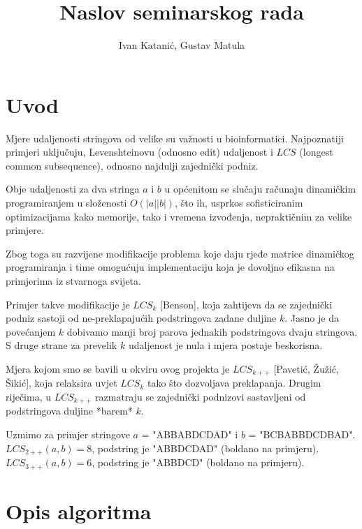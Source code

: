 \documentclass[times, utf8, seminar, numeric]{fer}
\begin{document}
\nocite{*}

\title{Naslov seminarskog rada}

\author{Ivan Katanić, Gustav Matula}


\maketitle

\tableofcontents

\chapter{Uvod}
Mjere udaljenosti stringova od velike su važnosti u bioinformatici.
Najpoznatiji primjeri uključuju, Levenshteinovu (odnosno edit)
udaljenost i $LCS$ (longest common subsequence), odnosno najdulji
zajednički podniz.

Obje udaljenosti za dva stringa $a$ i $b$ u općenitom se slučaju
računaju dinamičkim programiranjem u složenosti $O(|a||b|)$, što ih,
usprkos sofisticiranim optimizacijama kako memorije, tako i vremena
izvođenja, nepraktičnim za velike primjere.

Zbog toga su razvijene modifikacije problema koje daju rjeđe matrice
dinamičkog programiranja i time omogućuju implementaciju koja je 
dovoljno efikasna na primjerima iz stvarnoga svijeta.

Primjer takve modifikacije je $LCS_k$ [Benson], koja zahtijeva da
se zajednički podniz sastoji od ne-preklapajućih podstringova
zadane duljine $k$. Jasno je da povećanjem $k$ dobivamo manji
broj parova jednakih podstringova dvaju stringova. S druge strane
za prevelik $k$ udaljenost je nula i mjera postaje beskorisna.

Mjera kojom smo se bavili u okviru ovog projekta je $LCS_{k++}$ [Pavetić,
  Žužić, Šikić], koja relaksira uvjet $LCS_k$ tako što dozvoljava
preklapanja. Drugim riječima, u $LCS_{k++}$ razmatraju se zajednički
podnizovi sastavljeni od podstringova duljine *barem* $k$.

Uzmimo za primjer stringove $a$ = "ABBABDCDAD" i $b$ = "BCBABBDCDBAD".
$LCS_{2++}(a,b) = 8$, podstring je "ABBDCDAD" ({boldano na primjeru}).
$LCS_{3++}(a,b) = 6$, podstring je "ABBDCD" ({boldano na primjeru}).

\chapter{Opis algoritma}
\end{document}
